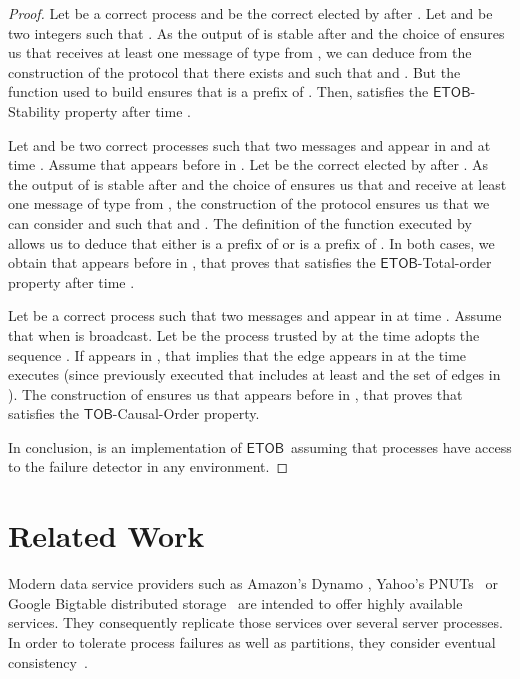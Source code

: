 \documentclass[11pt]{article}
\newcommand{\ETOB}{\ensuremath{\mathsf{ETOB}}}
\newcommand{\TOB}{\ensuremath{\mathsf{TOB}}}
\begin{document}
\begin{proof}
Let  be a correct process and  be the correct elected by  after . Let  and  be two integers such that . As the output of  is stable after  and the choice of  ensures us that  receives at least one message of type  from , we can deduce from the construction of the protocol that there exists  and  such that  and . But the function  used to build  ensures that  is a prefix of . Then,  satisfies the \ETOB-Stability property after time .

Let  and  be two correct processes such that two messages  and  appear in  and  at time . Assume that  appears before  in . Let  be the correct elected by  after . As the output of  is stable after  and the choice of  ensures us that  and  receive at least one message of type  from , the construction of the protocol ensures us that we can consider  and  such that  and . The definition of the function  executed by  allows us to deduce that either  is a prefix of  or  is a prefix of . In both cases, we obtain that  appears before  in , that proves that  satisfies the \ETOB-Total-order property after time .

Let  be a correct process such that two messages  and  appear in  at time . Assume that  when  is broadcast. Let  be the process trusted by  at the time  adopts the sequence . If  appears in , that implies that the edge  appears in  at the time  executes  (since  previously executed  that includes at least  and the set of edges  in ). The construction of  ensures us that  appears before  in , that proves that  satisfies the \TOB-Causal-Order property.

In conclusion,  is an implementation of \ETOB~assuming that processes have access to the  failure detector in any environment.
\end{proof}




\section{Related Work}
\label{sec:related}


Modern data service providers such as Amazon's Dynamo
\cite{DeCandia2007},  Yahoo's PNUTs~\cite{Cooper2008} or Google
Bigtable distributed storage~\cite{Chang2008} are intended to offer
highly available services. They consequently replicate those services
over several server processes. In order to  tolerate process failures as well
as partitions, they consider eventual consistency~\cite{SS05,
  Vogels2009,Singh2009}. 
  
\end{document}
